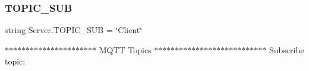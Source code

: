 \subsubsection{\texorpdfstring{T\+O\+P\+I\+C\+\_\+\+S\+UB}{TOPIC\_SUB}}
{\footnotesize\ttfamily string Server.\+T\+O\+P\+I\+C\+\_\+\+S\+UB = \char`\"{}Client\char`\"{}}



\textquotesingle{}\textquotesingle{}\textquotesingle{} $\ast$$\ast$$\ast$$\ast$$\ast$$\ast$$\ast$$\ast$$\ast$$\ast$$\ast$$\ast$$\ast$$\ast$$\ast$$\ast$$\ast$$\ast$$\ast$$\ast$$\ast$$\ast$ M\+Q\+TT Topics $\ast$$\ast$$\ast$$\ast$$\ast$$\ast$$\ast$$\ast$$\ast$$\ast$$\ast$$\ast$$\ast$$\ast$$\ast$$\ast$$\ast$$\ast$$\ast$$\ast$$\ast$$\ast$$\ast$$\ast$$\ast$$\ast$$\ast$ \textquotesingle{}\textquotesingle{}\textquotesingle{} Subscribe topic\+: 

